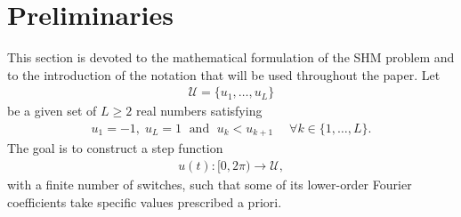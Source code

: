 \documentclass[twocolumn]{autart}    %
\begin{document}
\section{Preliminaries}\label{sec:math_formulation}

This section is devoted to the mathematical formulation of the SHM problem and to the introduction of the notation that will be used throughout the paper. Let 
\begin{align}\label{eq:Udef}
	\mathcal{U} = \{u_1, \ldots, u_L\}
\end{align}
be a given set of $L\geq 2$ real numbers satisfying
\begin{align*}
	u_1 = -1, \; u_L = 1 \;\text{ and } \; u_k<u_{k+1} \quad\; \forall k\in \{1,\ldots, L\}.
\end{align*}
The goal is to construct a step function
\begin{align*}
	u(t):[0,2\pi)\to\mathcal U,
\end{align*}
with a finite number of switches, such that some of its lower-order Fourier coefficients take specific values prescribed a priori.
\end{document}
